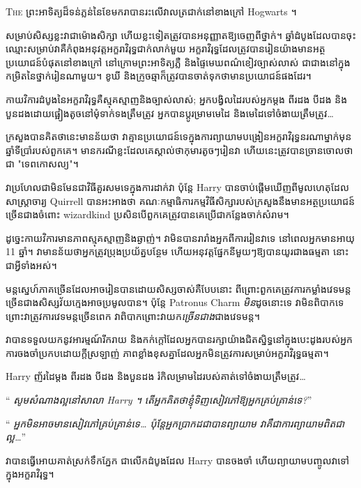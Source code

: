 
\lettrine{T}{he} ព្រះអាទិត្យដ៏ទន់ភ្លន់នៃខែមករាបានរះលើវាលត្រជាក់នៅខាងក្រៅ Hogwarts ។

សម្រាប់សិស្សខ្លះវាជាម៉ោងសិក្សា ហើយខ្លះទៀតត្រូវបានអនុញ្ញាតឱ្យចេញពីថ្នាក់។ ឆ្នាំដំបូងដែលបានចុះឈ្មោះសម្រាប់វាគឺកំពុងអនុវត្តអក្ខរាវិរុទ្ធជាក់លាក់មួយ អក្ខរាវិរុទ្ធដែលត្រូវបានរៀនយ៉ាងមានអត្ថប្រយោជន៍បំផុតនៅខាងក្រៅ នៅក្រោមព្រះអាទិត្យភ្លឺ និងផ្ទៃមេឃពណ៌ខៀវច្បាស់លាស់ ជាជាងនៅក្នុងកម្រិតនៃថ្នាក់រៀនណាមួយ។ ខូឃី និងក្រូចឆ្មាក៏ត្រូវបានចាត់ទុកថាមានប្រយោជន៍ផងដែរ។

កាយវិការដំបូងនៃអក្ខរាវិរុទ្ធគឺស្មុគស្មាញនិងច្បាស់លាស់; អ្នក​បង្វិល​ដៃ​របស់​អ្នក​ម្តង ពីរ​ដង បី​ដង និង​បួន​ដង​ដោយ​ផ្អៀង​តូច​នៅ​មុំ​ទាក់ទង​ត្រឹមត្រូវ អ្នក​បាន​ប្តូរ​ម្រាម​មេដៃ និង​មេដៃ​ទៅ​ចំងាយ​ត្រឹមត្រូវ…

ក្រសួងបានគិតថានេះមានន័យថា វាគ្មានប្រយោជន៍ទេក្នុងការព្យាយាមបង្រៀនអក្ខរាវិរុទ្ធនរណាម្នាក់មុនឆ្នាំទីប្រាំរបស់ពួកគេ។ មានករណីខ្លះដែលគេស្គាល់ថាកុមារតូចៗរៀនវា ហើយនេះត្រូវបានច្រានចោលថាជា "ទេពកោសល្យ"។

វាប្រហែលជាមិនមែនជាវិធីគួរសមទេក្នុងការដាក់វា ប៉ុន្តែ Harry បានចាប់ផ្តើមឃើញពីមូលហេតុដែលសាស្រ្តាចារ្យ Quirrell បានអះអាងថា គណៈកម្មាធិការកម្មវិធីសិក្សារបស់ក្រសួងនឹងមានអត្ថប្រយោជន៍ច្រើនជាងចំពោះ wizardkind ប្រសិនបើពួកគេត្រូវបានគេប្រើជាកន្លែងចាក់សំរាម។

ដូច្នេះកាយវិការមានភាពស្មុគស្មាញនិងឆ្ងាញ់។ វាមិនបានរារាំងអ្នកពីការរៀនវាទេ នៅពេលអ្នកមានអាយុ 11 ឆ្នាំ។ វាមានន័យថាអ្នកត្រូវប្រុងប្រយ័ត្នបន្ថែម ហើយអនុវត្តផ្នែកនីមួយៗឱ្យបានយូរជាងធម្មតា នោះជាអ្វីទាំងអស់។

មន្តស្នេហ៍ភាគច្រើនដែលអាចរៀនបានដោយសិស្សចាស់គឺបែបនោះ ពីព្រោះពួកគេត្រូវការកម្លាំងវេទមន្តច្រើនជាងសិស្សវ័យក្មេងអាចប្រមូលបាន។ ប៉ុន្តែ Patronus Charm \emph{មិន}ដូចនោះទេ វាមិនពិបាកទេព្រោះវាត្រូវការវេទមន្តច្រើនពេក វាពិបាកព្រោះវាយក\emph{ច្រើនជាង}ជាងវេទមន្ត។

វាបានទទួលយកនូវអារម្មណ៍រីករាយ និងកក់ក្តៅដែលអ្នកបានរក្សាយ៉ាងជិតស្និទ្ធនៅក្នុងបេះដូងរបស់អ្នក ការចងចាំប្រកបដោយក្តីស្រឡាញ់ ភាពខ្លាំងខុសគ្នាដែលអ្នកមិនត្រូវការសម្រាប់អក្ខរាវិរុទ្ធធម្មតា។

Harry ញ័រដៃម្តង ពីរដង បីដង និងបួនដង រំកិលម្រាមដៃរបស់គាត់ទៅចំងាយត្រឹមត្រូវ…

“\emph{ សូមសំណាងល្អនៅសាលា Harry ។ តើអ្នកគិតថាខ្ញុំទិញសៀវភៅឱ្យអ្នកគ្រប់គ្រាន់ទេ?}”

“\emph{ អ្នក​មិន​អាច​មាន​សៀវភៅ​គ្រប់​គ្រាន់​ទេ… ប៉ុន្តែ​អ្នក​ប្រាកដ​ជា​បាន​ព្យាយាម វា​គឺ​ជា​ការ​ព្យាយាម​ពិត​ជា​ល្អ…}”

វាបានធ្វើអោយគាត់ស្រក់ទឹកភ្នែក ជាលើកដំបូងដែល Harry បានចងចាំ ហើយព្យាយាមបញ្ចូលវាទៅក្នុងអក្ខរាវិរុទ្ធ។

